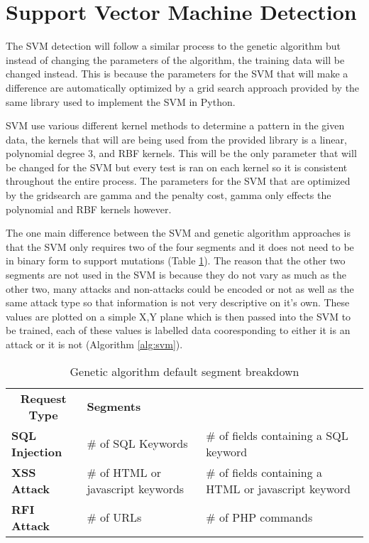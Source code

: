 \section{Support Vector Machine Detection}

The SVM detection will follow a similar process to the genetic algorithm but instead of changing the parameters of the algorithm, the training data will be changed instead.  This is because the parameters for the SVM that will make a difference are automatically optimized by a grid search approach provided by the same library used to implement the SVM in Python. %

SVM use various different kernel methods to determine a pattern in the given data, the kernels that will are being used from the provided library is a linear, polynomial degree 3, and RBF kernels.  This will be the only parameter that will be changed for the SVM but every test is ran on each kernel so it is consistent throughout the entire process.  The parameters for the SVM that are optimized by the gridsearch are gamma and the penalty cost, gamma only effects the polynomial and RBF kernels however.

The one main difference between the SVM and genetic algorithm approaches is that the SVM only requires two of the four segments and it does not need to be in binary form to support mutations (Table \ref{tab:svmSegments}).  The reason that the other two segments are not used in the SVM is because they do not vary as much as the other two, many attacks and non-attacks could be encoded or not as well as the same attack type so that information is not very descriptive on it's own.  These values are plotted on a simple X,Y plane which is then passed into the SVM to be trained, each of these values is labelled data cooresponding to either it is an attack or it is not (Algorithm \ref{alg:svm}).

\begin{table}
	\label{tab:svmSegments}
	\begin{tabular}{|p{1.5in}|p{2.25in}|p{2.25in}|}
	\hline
	\multicolumn{1}{|c|}{\textbf{Request Type}} & \multicolumn{2}{p{4.5in}|}{\textbf{Segments}}               \\ \hhline{|=|=|=|}
	\textbf{SQL Injection}                      & \# of SQL Keywords         & \# of fields containing a SQL keyword \\ \hline
	\textbf{XSS Attack}                      & \# of HTML or javascript keywords         & \# of fields containing a HTML or javascript keyword \\ \hline
	\textbf{RFI Attack}                      & \# of URLs         & \# of PHP commands \\ \hline
	\end{tabular}
	\caption{Genetic algorithm default segment breakdown}
\end{table}

